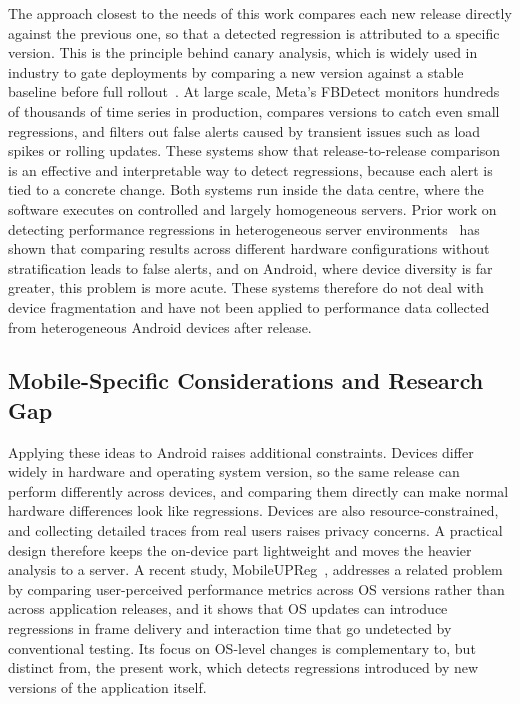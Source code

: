 The approach closest to the needs of this work compares each new release directly against the previous one, so that a detected regression is attributed to a specific version. This is the principle behind canary analysis, which is widely used in industry to gate deployments by comparing a new version against a stable baseline before full rollout~\cite{Kayenta, LindonRapidRegression}.
At large scale, Meta's FBDetect \cite{FBDetect} monitors hundreds of thousands of time series in production, compares versions to catch even small regressions, and filters out false alerts caused by transient issues such as load spikes or rolling updates. These systems show that release-to-release comparison is an effective and interpretable way to detect regressions, because each alert is tied to a concrete change. Both systems run inside the data centre, where the software executes on controlled and largely homogeneous servers. Prior work on detecting performance regressions in heterogeneous server environments~\cite{FooHeterogeneousICPE} has shown that comparing results across different hardware configurations without stratification leads to false alerts, and on Android, where device diversity is far greater, this problem is more acute. These systems therefore do not deal with device fragmentation and have not been applied to performance data collected from heterogeneous Android devices after release.


\subsection{Mobile-Specific Considerations and Research Gap}

Applying these ideas to Android raises additional constraints. Devices differ widely in hardware and operating system version, so the same release can perform differently across devices, and comparing them directly can make normal hardware differences look like regressions. Devices are also resource-constrained, and collecting detailed traces from real users raises privacy concerns. A practical design therefore keeps the on-device part lightweight and moves the heavier analysis to a server. A recent study, MobileUPReg~\cite{MobileUPReg}, addresses a related problem by comparing user-perceived performance metrics across OS versions rather than across application releases, and it shows that OS updates can introduce regressions in frame delivery and interaction time that go undetected by conventional testing. Its focus on OS-level changes is complementary to, but distinct from, the present work, which detects regressions introduced by new versions of the application itself.

